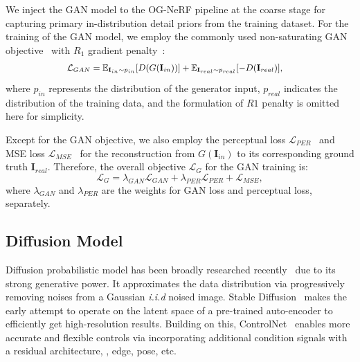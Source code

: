 We inject the GAN model to the OG-NeRF pipeline at the coarse stage for capturing primary in-distribution detail priors from the training dataset. For the training of the GAN model, we employ the commonly used  non-saturating GAN objective~\cite{GAN_goodfellow2014generative} with $R_1$ gradient penalty~\cite{R1reg_mescheder2018training}:
\begin{equation}
\small
\begin{split}
    & \mathcal{L}_{GAN} = 
    \mathbb{E}_{\textbf{I}_{in} \sim p_{in}} [ D(G(  \textbf{I}_{in} )) ]   +  \mathbb{E}_{\textbf{I}_{real} \sim p_{real}} [-D(\textbf{I}_{real})], 
\end{split}
\end{equation}
 where $p_{in}$ represents the distribution of the generator input, $p_{real}$ indicates the distribution of the training data, and the formulation of $R1$ penalty  is omitted here for simplicity.

 Except for the GAN objective, we also employ the perceptual loss $\mathcal{L}_{PER}$~\cite{Perceptual_wu2020unsupervised}   and MSE loss $\mathcal{L}_{MSE}$~\cite{GIRAFFE_niemeyer2021giraffe} for the reconstruction from $G(\textbf{I}_{in})$ to its corresponding ground truth $\textbf{I}_{real}$. Therefore, the overall objective  $\mathcal{L}_{G}$ for the GAN training is:
 \begin{equation}
 \label{eq:generative_objectives}
     \mathcal{L}_{G} = \lambda_{GAN} \mathcal{L}_{GAN} +\lambda_{PER} \mathcal{L}_{PER} + \mathcal{L}_{MSE},
 \end{equation}
 where $\lambda_{GAN}$ and $\lambda_{PER}$ are the weights for GAN loss and perceptual loss, separately. 

 
\subsection{\textbf{Diffusion Model}}
\label{sec:diff_model}

Diffusion probabilistic model has been broadly researched recently~\cite{croitoru2023diffusion0,dhariwal2021diffusion1,rombach2022LatentDiff,zhang2023addingControlNet} due to its strong generative power. It approximates the data distribution via progressively removing noises from a Gaussian \textit{i.i.d} noised image. Stable Diffusion~\cite{rombach2022LatentDiff} makes the early attempt to operate on the latent space of a pre-trained auto-encoder to efficiently get high-resolution results. Building on this, ControlNet~\cite{zhang2023addingControlNet} enables more accurate and flexible controls via incorporating additional condition signals with a residual architecture, \eg, edge, pose, etc. 

